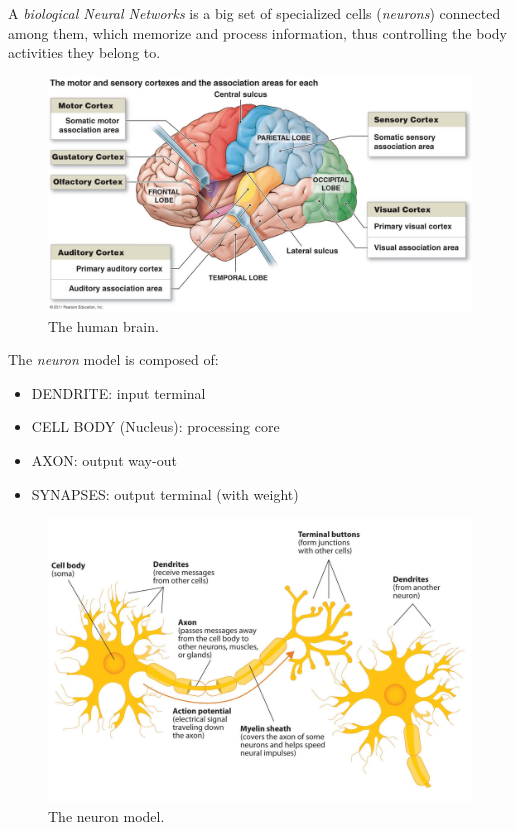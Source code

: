 
A \textit{biological Neural Networks} is a big set of specialized cells (\textit{neurons}) connected among them, which memorize and process information, thus controlling the body activities they belong to.

\begin{figure}[t]
	\centering
	\includegraphics[width=0.65\linewidth]{img/Brain}
	\caption{The human brain.}
\end{figure}

The \textit{neuron} model is composed of:
\begin{itemize}
	\item DENDRITE: input terminal
	\item CELL BODY (Nucleus): processing core
	\item AXON: output way-out
	\item SYNAPSES: output terminal (with weight)
\end{itemize}


\begin{figure}[t]
	\centering
	\includegraphics[width=0.4\linewidth]{img/neuron_model}
	\caption{The neuron model.}
\end{figure}

